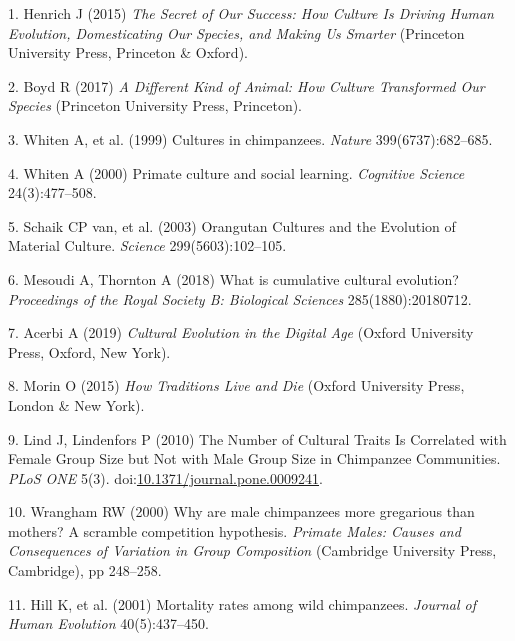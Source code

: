 \documentclass[9pt,twocolumn,twoside,]{pnas-new}
\begin{document}
\showmatmethods
\showacknow
\pnasbreak

\hypertarget{refs}{}
\hypertarget{ref-henrich_secret_2015}{}
1. Henrich J (2015) \emph{The Secret of Our Success: How Culture Is
Driving Human Evolution, Domesticating Our Species, and Making Us
Smarter} (Princeton University Press, Princeton \& Oxford).

\hypertarget{ref-boyd_different_2017}{}
2. Boyd R (2017) \emph{A Different Kind of Animal: How Culture
Transformed Our Species} (Princeton University Press, Princeton).

\hypertarget{ref-whiten_cultures_1999}{}
3. Whiten A, et al. (1999) Cultures in chimpanzees. \emph{Nature}
399(6737):682--685.

\hypertarget{ref-whiten_primate_2000}{}
4. Whiten A (2000) Primate culture and social learning. \emph{Cognitive
Science} 24(3):477--508.

\hypertarget{ref-van_schaik_orangutan_2003}{}
5. Schaik CP van, et al. (2003) Orangutan Cultures and the Evolution of
Material Culture. \emph{Science} 299(5603):102--105.

\hypertarget{ref-mesoudi_what_2018}{}
6. Mesoudi A, Thornton A (2018) What is cumulative cultural evolution?
\emph{Proceedings of the Royal Society B: Biological Sciences}
285(1880):20180712.

\hypertarget{ref-acerbi_cultural_2019}{}
7. Acerbi A (2019) \emph{Cultural Evolution in the Digital Age} (Oxford
University Press, Oxford, New York).

\hypertarget{ref-morin_how_2015}{}
8. Morin O (2015) \emph{How Traditions Live and Die} (Oxford University
Press, London \& New York).

\hypertarget{ref-lind_number_2010}{}
9. Lind J, Lindenfors P (2010) The Number of Cultural Traits Is
Correlated with Female Group Size but Not with Male Group Size in
Chimpanzee Communities. \emph{PLoS ONE} 5(3).
doi:\href{https://doi.org/10.1371/journal.pone.0009241}{10.1371/journal.pone.0009241}.

\hypertarget{ref-wrangham_why_2000}{}
10. Wrangham RW (2000) Why are male chimpanzees more gregarious than
mothers? A scramble competition hypothesis. \emph{Primate Males: Causes
and Consequences of Variation in Group Composition} (Cambridge
University Press, Cambridge), pp 248--258.

\hypertarget{ref-hill_mortality_2001}{}
11. Hill K, et al. (2001) Mortality rates among wild chimpanzees.
\emph{Journal of Human Evolution} 40(5):437--450.
\end{document}
